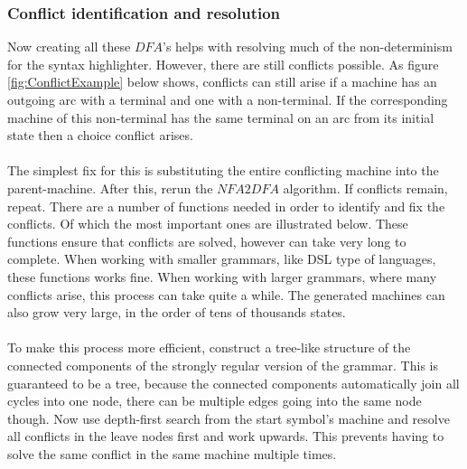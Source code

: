	\pagebreak
	
	\subsubsection{Conflict identification and resolution} \label{sec:ConflictResolutionAlgorithm}
	Now creating all these $DFA$'s helps with resolving much of the non-determinism for the syntax highlighter. However, there are still conflicts possible. As figure \ref{fig:ConflictExample} below shows, conflicts can still arise if a machine has an outgoing arc with a terminal and one with a non-terminal. If the corresponding machine of this non-terminal has the same terminal on an arc from its initial state then a choice conflict arises.\\\\
	The simplest fix for this is substituting the entire conflicting machine into the parent-machine. After this, rerun the $NFA2DFA$ algorithm. If conflicts remain, repeat. There are a number of functions needed in order to identify and fix the conflicts. Of which the most important ones are illustrated below. These functions ensure that conflicts are solved, however can take very long to complete. When working with smaller grammars, like DSL type of languages, these functions works fine. When working with larger grammars, where many conflicts arise, this process can take quite a while. The generated machines can also grow very large, in the order of tens of thousands states.\\\\
	To make this process more efficient, construct a tree-like structure of the connected components of the strongly regular version of the grammar. This is guaranteed to be a tree, because the connected components automatically join all cycles into one node, there can be multiple edges going into the same node though. Now use depth-first search from the start symbol's machine and resolve all conflicts in the leave nodes first and work upwards. This prevents having to solve the same conflict in the same machine multiple times.\\
	
	\pagebreak
